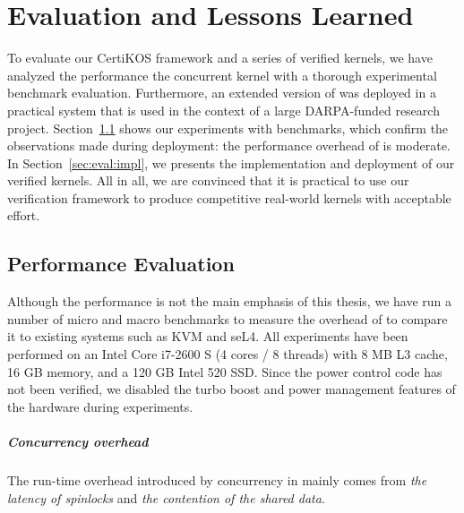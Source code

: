
\chapter{Evaluation and Lessons Learned}
\label{chap-eval}
To evaluate
our CertiKOS framework
and a series of verified kernels,
we have analyzed the performance  the  \cCTOS{} concurrent kernel
with a thorough experimental benchmark evaluation.
Furthermore, an extended version of \cCTOS{}
was deployed in a practical system that is used in the context of a
large DARPA-funded research project. 
Section~\ref{sec:eval:perform} shows our experiments with benchmarks, which
confirm the observations made during deployment: the performance
overhead of \cCTOS{} is moderate. 
In Section~\ref{sec:eval:impl},
we presents the implementation and deployment of
our verified kernels.
All in all, we are convinced that it is
practical to use our verification framework to produce competitive
real-world kernels with acceptable effort.


\section{Performance Evaluation} 
\label{sec:eval:perform}
Although the performance is not the main emphasis of this thesis, we
have run a number of micro and macro benchmarks to measure the
overhead of {\cCTOS}
to compare it to existing systems such
as KVM and seL4. All experiments have been performed on an Intel Core
i7-2600 S (4 cores / 8 threads) with 8 MB L3 cache, 16 GB memory, and
a 120 GB Intel 520 SSD. Since the power control code has not been
verified, we disabled the turbo boost and power management features of
the hardware during experiments.


\paragraph{Concurrency overhead} The run-time overhead introduced by concurrency
in {\cCTOS} mainly comes from \emph{the latency of spinlocks} and \emph{the
	contention of the shared data}. 


